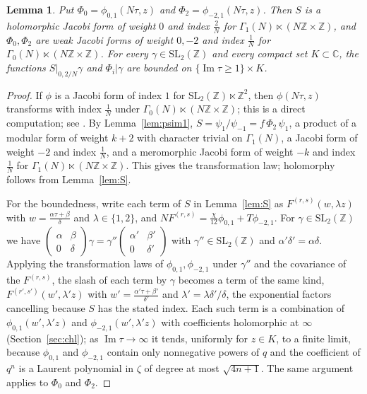 \documentclass[11pt]{amsart}
\newtheorem{lemma}[theorem]{Lemma}
\theoremstyle{definition}
\newcommand{\ZZ}{\mathbb{Z}}
\newcommand{\CC}{\mathbb{C}}
\newcommand{\SL}{\mathrm{SL}_2(\ZZ)}
\begin{document}
\begin{lemma}\label{lem:Smod}
Put $\Phi_0=\phi_{0,1}(N\tau,z)$ and $\Phi_2=\phi_{-2,1}(N\tau,z)$. Then $S$ is a holomorphic Jacobi form of weight $0$ and index $\frac2N$ for $\Gamma_1(N)\ltimes(N\ZZ\times\ZZ)$, and $\Phi_0,\Phi_2$ are weak Jacobi forms of weight $0,-2$ and index $\frac1N$ for $\Gamma_0(N)\ltimes(N\ZZ\times\ZZ)$. For every $\gamma\in\SL$ and every compact set $K\subset\CC$, the functions $S|_{0,2/N}\gamma$ and $\Phi_i|\gamma$ are bounded on $\{\operatorname{Im}\tau\ge1\}\times K$.
\end{lemma}

\begin{proof}
If $\phi$ is a Jacobi form of index $1$ for $\SL\ltimes\ZZ^2$, then $\phi(N\tau,z)$ transforms with index $\frac1N$ under $\Gamma_0(N)\ltimes(N\ZZ\times\ZZ)$; this is a direct computation; see \cite[\S4]{BSS25}. By Lemma~\ref{lem:psim1}, $S=\psi_1/\psi_{-1}=f\,\Phi_2\,\psi_1$, a product of a modular form of weight $k+2$ with character trivial on $\Gamma_1(N)$, a Jacobi form of weight $-2$ and index $\frac1N$, and a meromorphic Jacobi form of weight $-k$ and index $\frac1N$ for $\Gamma_1(N)\ltimes(N\ZZ\times\ZZ)$. This gives the transformation law; holomorphy follows from Lemma~\ref{lem:S}.

For the boundedness, write each term of $S$ in Lemma~\ref{lem:S} as $F^{(r,s)}(w,\lambda z)$ with $w=\frac{\alpha\tau+\beta}\delta$ and $\lambda\in\{1,2\}$, and $NF^{(r,s)}=\frac{\chi}{12}\phi_{0,1}+T\phi_{-2,1}$. For $\gamma\in\SL$ we have $\left(\begin{smallmatrix}\alpha&\beta\\0&\delta\end{smallmatrix}\right)\gamma=\gamma''\left(\begin{smallmatrix}\alpha'&\beta'\\0&\delta'\end{smallmatrix}\right)$ with $\gamma''\in\SL$ and $\alpha'\delta'=\alpha\delta$. Applying the transformation laws of $\phi_{0,1},\phi_{-2,1}$ under $\gamma''$ and the covariance of the $F^{(r,s)}$, the slash of each term by $\gamma$ becomes a term of the same kind, $F^{(r',s')}(w',\lambda'z)$ with $w'=\frac{\alpha'\tau+\beta'}{\delta'}$ and $\lambda'=\lambda\delta'/\delta$, the exponential factors cancelling because $S$ has the stated index. Each such term is a combination of $\phi_{0,1}(w',\lambda'z)$ and $\phi_{-2,1}(w',\lambda'z)$ with coefficients holomorphic at $\infty$ (Section~\ref{sec:chl}); as $\operatorname{Im}\tau\to\infty$ it tends, uniformly for $z\in K$, to a finite limit, because $\phi_{0,1}$ and $\phi_{-2,1}$ contain only nonnegative powers of $q$ and the coefficient of $q^n$ is a Laurent polynomial in $\zeta$ of degree at most $\sqrt{4n+1}$. The same argument applies to $\Phi_0$ and $\Phi_2$.
\end{proof}
\end{document}
